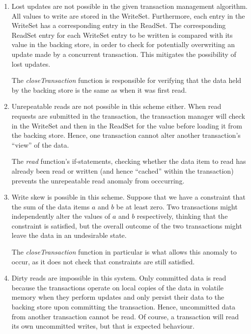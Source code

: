 \documentclass{article}
\begin{document}
\begin{enumerate}
    \item
        Lost updates are not possible in the given transaction management
        algorithm.  All values to write are stored in the WriteSet.
        Furthermore, each entry in the WriteSet has a corresponding entry in
        the ReadSet. The corresponding ReadSet entry for each WriteSet entry to
        be written is compared with its value in the backing store, in order to
        check for potentially overwriting an update made by a concurrent
        transaction. This mitigates the possibility of lost updates.

        The \emph{closeTransaction} function is responsible for verifying that
        the data held by the backing store is the same as when it was first
        read.

    \item
        Unrepeatable reads are not possible in this scheme either. When read
        requests are submitted in the transaction, the transaction manager will
        check in the WriteSet and then in the ReadSet for the value before
        loading it from the backing store. Hence, one transaction cannot alter
        another transaction's ``view'' of the data.

        The \emph{read} function's if-statements, checking whether the data
        item to read has already been read or written (and hence ``cached''
        within the transaction) prevents the unrepeatable read anomaly from
        occcurring.

    \item
        Write skew is possible in this scheme. Suppose that we have a
        constraint that the sum of the data items $a$ and $b$ be at least zero.
        Two transactions might independently alter the values of $a$ and $b$
        respectively, thinking that the constraint is satisfied, but the
        overall outcome of the two transactions might leave the data in an
        undesirable state.

        The \emph{closeTransaction} function in particular is what allows this
        anomaly to occur, as it does not check that constraints are still
        satisfied.

    \item
        Dirty reads are impossible in this system. Only committed data is read
        because the transactions operate on local copies of the data in
        volatile memory when they perform updates and only persist their data
        to the backing store upon committing the transaction. Hence,
        uncommitted data from another transaction cannot be read. Of course, a
        transaction will read its own uncommitted writes, but that is expected
        behaviour.


\end{enumerate}
\end{document}
